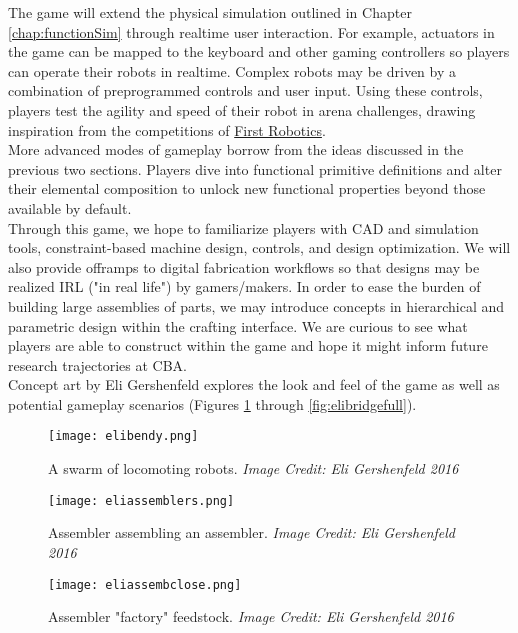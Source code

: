 {The game will extend the physical simulation outlined in Chapter \ref{chap:functionSim} through realtime user interaction.  For example, actuators in the game can be mapped to the keyboard and other gaming controllers so players can operate their robots in realtime.  Complex robots may be driven by a combination of preprogrammed controls and user input.  Using these controls, players test the agility and speed of their robot in arena challenges, drawing inspiration from the competitions of \href{http://www.firstinspires.org/robotics/frc}{First Robotics}.\\

More advanced modes of gameplay borrow from the ideas discussed in the previous two sections.  Players dive into functional primitive definitions and alter their elemental composition to unlock new functional properties beyond those available by default.\\

Through this game, we hope to familiarize players with CAD and simulation tools, constraint-based machine design, controls, and design optimization.  We will also provide offramps to digital fabrication workflows so that designs may be realized IRL ("in real life") by gamers/makers.  In order to ease the burden of building large assemblies of parts, we may introduce concepts in hierarchical and parametric design within the crafting interface.  We are curious to see what players are able to construct within the game and hope it might inform future research trajectories at CBA.\\

Concept art by Eli Gershenfeld explores the look and feel of the game as well as potential gameplay scenarios (Figures \ref{fig:elibendy} through \ref{fig:elibridgefull}).

\clearpage

\begin{figure}
  \texttt{[image: elibendy.png]}
  \caption{A swarm of locomoting robots.  \textit{Image Credit: Eli Gershenfeld 2016}}
  \label{fig:elibendy}
\end{figure}

\begin{figure}
  \texttt{[image: eliassemblers.png]}
  \caption{Assembler assembling an assembler.  \textit{Image Credit: Eli Gershenfeld 2016}}
  \label{fig:eliassemblers}
\end{figure}

\begin{figure}
  \texttt{[image: eliassembclose.png]}
  \caption{Assembler "factory" feedstock.  \textit{Image Credit: Eli Gershenfeld 2016}}
  \label{fig:eliassembclose}
\end{figure}

}
